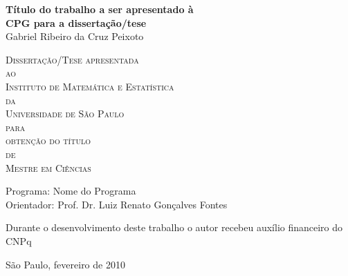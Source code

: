 \documentclass[11pt,twoside,a4paper]{book}
\begin{document}
\frontmatter 
\fancyhead[RO]{{\footnotesize\rightmark}\hspace{2em}\thepage}
\setcounter{tocdepth}{2}
\fancyhead[LE]{\thepage\hspace{2em}\footnotesize{\leftmark}}
\fancyhead[RE,LO]{}
\fancyhead[RO]{{\footnotesize\rightmark}\hspace{2em}\thepage}

\onehalfspacing  %

\thispagestyle{empty}
\begin{center}
  \vspace*{2.3cm}
  \textbf{\Large{Título do trabalho a ser apresentado à \\
      CPG para a dissertação/tese}}\\
  
  \vspace*{1.2cm}
  \Large{Gabriel Ribeiro da Cruz Peixoto}
  
  \vskip 2cm
  \textsc{
    Dissertação/Tese apresentada\\[-0.25cm] 
    ao\\[-0.25cm]
    Instituto de Matemática e Estatística\\[-0.25cm]
    da\\[-0.25cm]
    Universidade de São Paulo\\[-0.25cm]
    para\\[-0.25cm]
    obtenção do título\\[-0.25cm]
    de\\[-0.25cm]
    Mestre em Ciências}
  
  \vskip 1.5cm
  Programa: Nome do Programa\\
  Orientador: Prof. Dr. Luiz Renato Gonçalves Fontes

  \vskip 1cm
  \normalsize{Durante o desenvolvimento deste trabalho o autor recebeu auxílio
    financeiro do CNPq}
  
  \vskip 0.5cm
  \normalsize{São Paulo, fevereiro de 2010}
\end{center}

\end{document}
